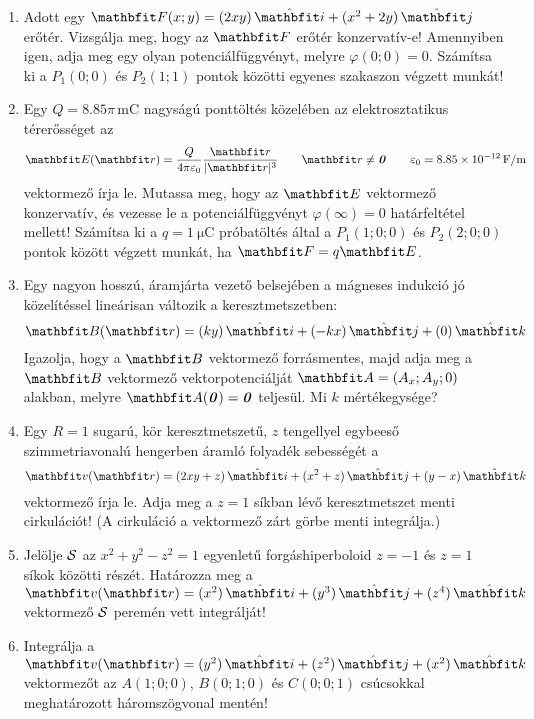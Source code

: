 \documentclass{szb-practice}
\begin{document}
\begin{enumerate}
  \item Adott egy $\rvec F(x; y) = \ijz{2xy}{x^2 + 2y}$ erőtér. Vizsgálja meg,
        hogy az $\rvec F$ erőtér konzervatív-e! Amennyiben igen, adja meg egy
        olyan potenciálfüggvényt, melyre $\varphi(0;0) = 0$. Számítsa ki a
        $P_1(0; 0)$ és $P_2(1; 1)$ pontok közötti egyenes szakaszon végzett
        munkát!

  \item Egy $Q = \num{8.85}\pi\,\si{\milli\coulomb}$ nagyságú ponttöltés
        közelében az elektrosztatikus térerősséget az
        $$
          \rvec E(\coordvec) = \frac{Q}{4\pi \varepsilon_0}
          \frac{\coordvec}{|\coordvec|^3}
          \qquad
          \coordvec \neq \nvec
          \qquad \varepsilon_0 = \SI[per-mode=symbol]{8,85e-12}{\farad\per\meter}
        $$
        vektormező írja le. Mutassa meg, hogy az $\rvec E$ vektormező
        konzervatív, és vezesse le a potenciálfüggvényt $\varphi(\infty) = 0$
        határfeltétel mellett! Számítsa ki a $q = \SI{1}{\micro\coulomb}$
        próbatöltés által a $P_1(1; 0; 0)$ és $P_2(2; 0; 0)$ pontok között
        végzett munkát, ha $\rvec F = q \rvec E$.

  \item Egy nagyon hosszú, áramjárta vezető belsejében a mágneses indukció
        jó közelítéssel lineárisan változik a keresztmetszetben:
        $$
          \rvec B(\coordv) = \ijk{ky}{-kx}{0}
        $$
        Igazolja, hogy a $\rvec B$ vektormező forrásmentes, majd adja meg
        a $\rvec B$ vektormező vektorpotenciálját $\rvec A = (A_x; A_y; 0)$
        alakban, melyre $\rvec A(\nvec) = \nvec$ teljesül. Mi $k$ mértékegysége?

  \item Egy $R = 1$ sugarú, kör keresztmetszetű, $z$ tengellyel egybeeső
        szimmetriavonalú hengerben áramló folyadék sebességét a
        $$
          \rvec v(\coordv) = \ijk{2xy + z}{x^2 + z}{y - x}
        $$
        vektormező írja le. Adja meg a $z = 1$ síkban lévő keresztmetszet
        menti cirkulációt!
        (A cirkuláció a vektormező zárt görbe menti integrálja.)

  \item Jelölje $\mathcal{S}$ az $x^2 + y^2 - z^2 = 1$ egyenletű
        forgáshiperboloid $z = -1$ és $z = 1$ síkok közötti részét.
        Határozza meg a $\rvec v(\coordvec) = \ijk{x^2}{y^3}{z^4}$
        vektormező $\mathcal{S}$ peremén vett integrálját!

  \item Integrálja a $\rvec v(\coordvec) = \ijk{y^2}{z^2}{x^2}$
        vektormezőt az $A(1;0;0)$, $B(0;1;0)$ és $C(0;0;1)$ csúcsokkal
        meghatározott háromszögvonal mentén!
\end{enumerate}
\end{document}
